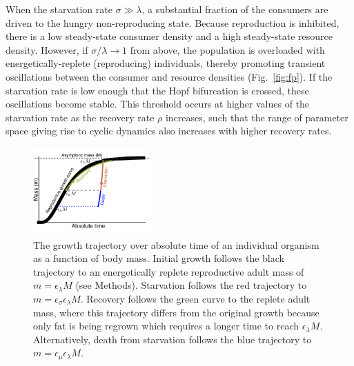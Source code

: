 \documentclass[twocolumn,preprintnumbers,amsmath,amssymb,superscriptaddress]{revtex4}
\begin{document}
\begin{bibunit}[unsrt]
  When the starvation rate $\sigma\gg\lambda$, a substantial fraction of the
  consumers are driven to the hungry non-reproducing state.  Because
  reproduction is inhibited, there is a low steady-state consumer density and a
  high steady-state resource density.  However, if $\sigma/\lambda\to 1$ from
  above, the population is overloaded with energetically-replete (reproducing)
  individuals, thereby promoting transient oscillations between the consumer
  and resource densities (Fig.~\ref{fig:fp}).  If the starvation rate is low
  enough that the Hopf bifurcation is crossed, these oscillations become
  stable.  This threshold occurs at higher values of the starvation rate as the recovery rate $\rho$ increases, such that the range of parameter space giving rise to cyclic dynamics also increases with higher recovery rates.\\


  \begin{figure}
  \centering
  \includegraphics[width=0.4\textwidth]{Growth-trajectory-diagram-eps-converted-to.pdf}
  \caption{\small{ The growth trajectory over absolute time of an individual organism as a function of body mass.  
  Initial growth follows the black trajectory to an energetically replete reproductive adult mass of $m=\epsilon_\lambda M$ (see Methods). %
  Starvation follows the red trajectory to $m = \epsilon_\sigma \epsilon_\lambda  M$. 
  Recovery follows the green curve to the replete adult mass, where this trajectory differs from the original growth because only fat is being regrown which requires a longer time to reach $\epsilon_\lambda M$. %
  Alternatively, death from starvation follows the blue trajectory to $m=\epsilon_\mu \epsilon_\lambda  M$.}\label{fig:growth}}
  \end{figure}


\end{bibunit}
\end{document}
